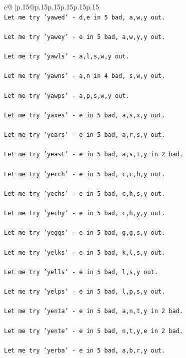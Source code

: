 \documentclass{article}
\begin{document}
{\begin{supertabular}{c@{$\;$}|p{.15\linewidth}@{}p{.15\linewidth}p{.15\linewidth}p{.15\linewidth}p{.15\linewidth}p{.15\linewidth}}
{{{\\ 
\texttt{Let me try 'yawed' {-} d,e in 5 bad, a,w,y out. } \\
\\ 
\texttt{Let me try 'yawey' {-} e in 5 bad, a,w,y,y out. } \\
\\ 
\texttt{Let me try 'yawls' {-} a,l,s,w,y out. } \\
\\ 
\texttt{Let me try 'yawns' {-} a,n in 4 bad, s,w,y out. } \\
\\ 
\texttt{Let me try 'yawps' {-} a,p,s,w,y out. } \\
\\ 
\texttt{Let me try 'yaxes' {-} e in 5 bad, a,s,x,y out. } \\
\\ 
\texttt{Let me try 'years' {-} e in 5 bad, a,r,s,y out. } \\
\\ 
\texttt{Let me try 'yeast' {-} e in 5 bad, a,s,t,y in 2 bad. } \\
\\ 
\texttt{Let me try 'yecch' {-} e in 5 bad, c,c,h,y out. } \\
\\ 
\texttt{Let me try 'yechs' {-} e in 5 bad, c,h,s,y out. } \\
\\ 
\texttt{Let me try 'yechy' {-} e in 5 bad, c,h,y,y out. } \\
\\ 
\texttt{Let me try 'yeggs' {-} e in 5 bad, g,g,s,y out. } \\
\\ 
\texttt{Let me try 'yelks' {-} e in 5 bad, k,l,s,y out. } \\
\\ 
\texttt{Let me try 'yells' {-} e in 5 bad, l,s,y out. } \\
\\ 
\texttt{Let me try 'yelps' {-} e in 5 bad, l,p,s,y out. } \\
\\ 
\texttt{Let me try 'yenta' {-} e in 5 bad, a,n,t,y in 2 bad. } \\
\\ 
\texttt{Let me try 'yente' {-} e in 5 bad, n,t,y,e in 2 bad. } \\
\\ 
\texttt{Let me try 'yerba' {-} e in 5 bad, a,b,r,y out. } \\
}}}
\end{supertabular}}
\end{document}
